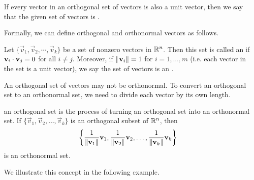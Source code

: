 \documentclass{ximera}
\begin{document}
If every vector in an orthogonal set of vectors is also a unit vector, then we say that the given set of vectors is .

\begin{center}
 \end{center}

Formally, we can define orthogonal and orthonormal vectors as follows.

\begin{definition}\label{orthset}
Let $\{ \vec{v}_1, \vec{v}_2, \cdots, \vec{v}_k \}$ be a set of nonzero
vectors in $\mathbb{R}^n$. Then this set is called an
 if 
$\mathbf{v}_i \cdot \mathbf{v}_j = 0$ for all $i \neq j$.
Moreover, if $\left\lVert\mathbf{v}_i\right\rVert=1$ for $i=1,\ldots,m$ (i.e. each vector in the set is a unit vector), we say the set of vectors is an .
\end{definition}

An orthogonal set of vectors may not be orthonormal.  To convert an orthogonal set to an orthonormal set, we need to divide each vector by its own length.

\begin{definition}\label{normalizing}
 an orthogonal set is the process of turning an orthogonal set into an orthonormal set.
If $\{ \vec{v}_1, \vec{v}_2, \ldots, \vec{v}_k\}$
is an orthogonal subset of $\mathbb{R}^n$,
then
\[ \left\{
\frac{1}{\left\lVert\mathbf{v}_1\right\rVert}\mathbf{v}_1,
\frac{1}{\left\lVert\mathbf{v}_2\right\rVert}\mathbf{v}_2, \ldots,
\frac{1}{\left\lVert\mathbf{v}_k\right\rVert}\mathbf{v}_k \right\}
\]
is an orthonormal set.
\end{definition}

We illustrate this concept in the following example.
\end{document}
